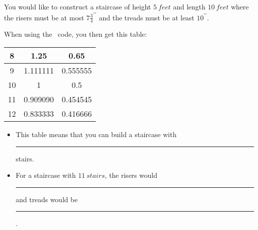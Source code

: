 \documentclass{../ximera}
\begin{document}
\begin{exercise}
 You would like to construct a staircase of height $5\ feet$ and length $10\ feet$ where the risers must be at most $7\frac{3}{4}^{\prime\prime}$ and the treads must be at least $10^{\prime\prime}$. 
 
 

 
When using the \snap\ code, you then get this table:

\begin{tabular}{|c|c|c|}\hline
8&1.25& 0.65\\\hline
9& 1.111111& 0.555555 \\\hline
10 & 1 & 0.5\\\hline
11 & 0.909090 & 0.454545\\\hline
12&0.833333&0.416666\\\hline
\end{tabular}

\begin{itemize}
 \item This table means that you can build a staircase with \rule{2cm}{0.4pt} stairs.
 \item For a staircase with $11\ stairs$, the risers would \rule{2cm}{0.4pt} and treads would be \rule{2cm}{0.4pt}.
\end{itemize}
\end{exercise}
\vfill
{}
\end{document}
